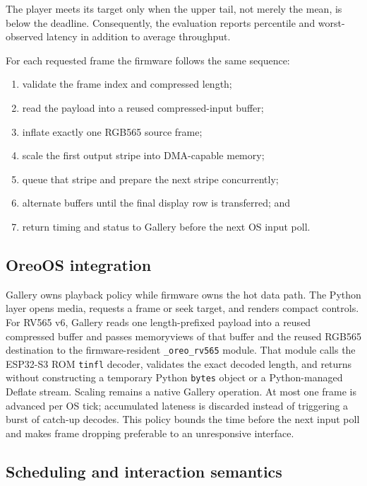 \documentclass[11pt,twocolumn]{article}
\begin{document}
The player meets its target only when the upper tail, not merely the mean, is
below the deadline.  Consequently, the evaluation reports percentile and
worst-observed latency in addition to average throughput.

For each requested frame the firmware follows the same sequence:

\begin{enumerate}
  \item validate the frame index and compressed length;
  \item read the payload into a reused compressed-input buffer;
  \item inflate exactly one RGB565 source frame;
  \item scale the first output stripe into DMA-capable memory;
  \item queue that stripe and prepare the next stripe concurrently;
  \item alternate buffers until the final display row is transferred; and
  \item return timing and status to Gallery before the next OS input poll.
\end{enumerate}

\subsection{OreoOS integration}

Gallery owns playback policy while firmware owns the hot data path.  The
Python layer opens media, requests a frame or seek target, and renders compact
controls.  For RV565 v6, Gallery reads one length-prefixed payload into a
reused compressed buffer and passes memoryviews of that buffer and the reused
RGB565 destination to the firmware-resident \texttt{\_oreo\_rv565} module.
That module calls the ESP32-S3 ROM \texttt{tinfl} decoder, validates the exact
decoded length, and returns without constructing a temporary Python
\texttt{bytes} object or a Python-managed Deflate stream.  Scaling remains a
native Gallery operation.  At most one frame is advanced per OS tick;
accumulated lateness is discarded instead of triggering a burst of catch-up
decodes.  This policy bounds the time before the next input poll and makes
frame dropping preferable to an unresponsive interface.

\subsection{Scheduling and interaction semantics}
\end{document}
